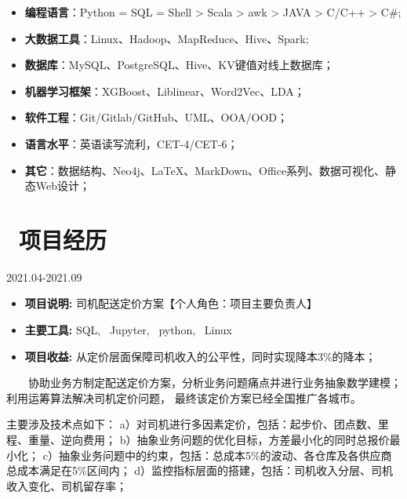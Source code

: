 \documentclass{resume}
\begin{document}
\begin{itemize}  [parsep=0.5ex]

   \item   \textbf{编程语言}：Python = SQL = Shell > Scala > awk > JAVA > C/C++ > C\#;
   \item    \textbf{大数据工具}：Linux、Hadoop、MapReduce、Hive、Spark;
   \item    \textbf{数据库}：MySQL、PostgreSQL、Hive、KV键值对线上数据库；
   \item    \textbf{机器学习框架}：XGBoost、Liblinear、Word2Vec、LDA；
   \item    \textbf{软件工程}：Git/Gitlab/GitHub、UML、OOA/OOD；
   \item    \textbf{语言水平}：英语读写流利，CET-4/CET-6；
   \item    \textbf{其它}：数据结构、Neo4j、LaTeX、MarkDown、Office系列、数据可视化、静态Web设计；
 
\end{itemize}

\medskip










\section{   \faUsers    \ 项目经历}





                      {2021.04-2021.09}

\begin{itemize}  [parsep=0.5ex]

  \item   \textbf{  项目说明:  }   {  司机配送定价方案【个人角色：项目主要负责人】  } 
  \item   \textbf{  主要工具:  }   {  SQL, \ Jupyter, \ python, \ Linux }
  \item   \textbf{  项目收益:  }   { 从定价层面保障司机收入的公平性，同时实现降本3\%的降本； }

\end{itemize}


{    \ \ \ \ 协助业务方制定配送定价方案，分析业务问题痛点并进行业务抽象数学建模；利用运筹算法解决司机定价问题，
最终该定价方案已经全国推广各城市。

主要涉及技术点如下：
a）对司机进行多因素定价，包括：起步价、团点数、里程、重量、逆向费用；
b）抽象业务问题的优化目标，方差最小化的同时总报价最小化；
c）抽象业务问题中的约束，包括：总成本5\%的波动、各仓库及各供应商总成本满足在5\%区间内；
d）监控指标层面的搭建，包括：司机收入分层、司机收入变化、司机留存率；
}
\end{document}
